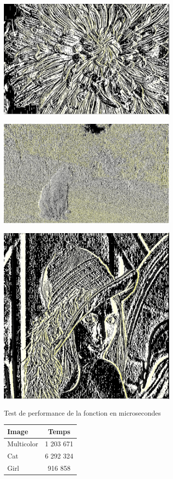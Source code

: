 \documentclass{article}
\begin{document}
\begin{center} 
    \includegraphics[width=9cm]{../Image_fonctions/Multicolor/PrewittH.PNG}
\end{center}
\begin{center} 
    \includegraphics[width=9cm]{../Image_fonctions/Cat/PrewittH.PNG}
\end{center}
\begin{center} 
    \includegraphics[width=9cm]{../Image_fonctions/Lenna/PrewittH.PNG}
\end{center}

\begin{center}
\medbreak
Test de performance
 de la fonction en microsecondes
\bigbreak
   \begin{tabular}{ | l | c | }
     \hline
     Image & Temps \\
     \hline
     Multicolor & 1 203 671 \\
     \hline
     Cat & 6 292 324 \\
     \hline
     Girl & 916 858 \\
     \hline
   \end{tabular}
 \end{center}
\bigbreak
\end{document}
